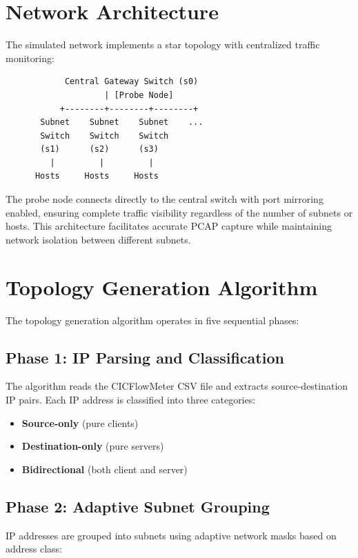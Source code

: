 \documentclass[11pt,a4paper]{article}
\begin{document}
\section{Network Architecture}

The simulated network implements a star topology with centralized traffic monitoring:

\begin{verbatim}
            Central Gateway Switch (s0)
                    | [Probe Node]
           +--------+--------+--------+
       Subnet    Subnet    Subnet    ...
       Switch    Switch    Switch
       (s1)      (s2)      (s3)
         |         |         |
      Hosts     Hosts     Hosts
\end{verbatim}

The probe node connects directly to the central switch with port mirroring enabled, ensuring complete traffic visibility regardless of the number of subnets or hosts. This architecture facilitates accurate PCAP capture while maintaining network isolation between different subnets.

\section{Topology Generation Algorithm}

The topology generation algorithm operates in five sequential phases:

\subsection{Phase 1: IP Parsing and Classification}

The algorithm reads the CICFlowMeter CSV file and extracts source-destination IP pairs. Each IP address is classified into three categories:
\begin{itemize}
    \item \textbf{Source-only} (pure clients)
    \item \textbf{Destination-only} (pure servers)
    \item \textbf{Bidirectional} (both client and server)
\end{itemize}

\subsection{Phase 2: Adaptive Subnet Grouping}

IP addresses are grouped into subnets using adaptive network masks based on address class:
\end{document}
